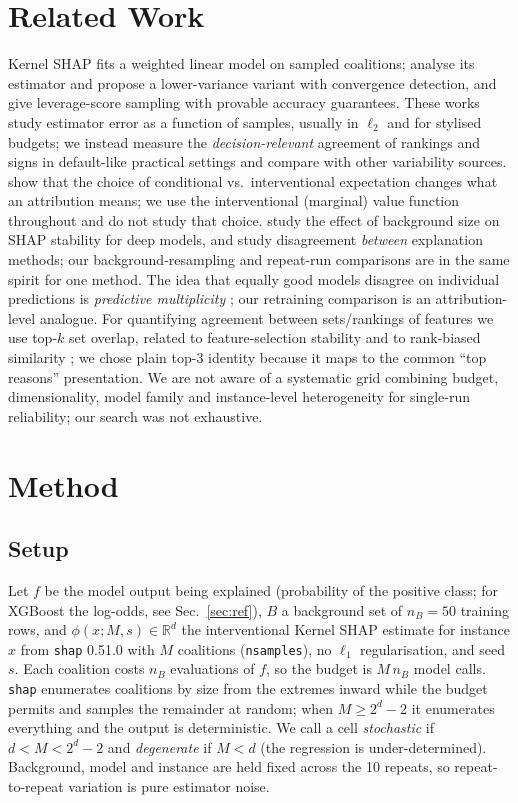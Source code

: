\documentclass{article}
\begin{document}
\section{Related Work}
Kernel SHAP \citep{lundberg2017} fits a weighted linear model on sampled coalitions; \citet{covert2021} analyse its estimator and propose a lower-variance variant with convergence detection, and \citet{musco2024} give leverage-score sampling with provable accuracy guarantees. These works study estimator error as a function of samples, usually in $\ell_2$ and for stylised budgets; we instead measure the \emph{decision-relevant} agreement of rankings and signs in default-like practical settings and compare with other variability sources. \citet{chen2020} show that the choice of conditional vs.\ interventional expectation changes what an attribution means; we use the interventional (marginal) value function throughout and do not study that choice. \citet{yuan2022} study the effect of background size on SHAP stability for deep models, and \citet{krishna2022} study disagreement \emph{between} explanation methods; our background-resampling and repeat-run comparisons are in the same spirit for one method. The idea that equally good models disagree on individual predictions is \emph{predictive multiplicity} \citep{marx2020}; our retraining comparison is an attribution-level analogue. For quantifying agreement between sets/rankings of features we use top-$k$ set overlap, related to feature-selection stability \citep{nogueira2018} and to rank-biased similarity \citep{webber2010}; we chose plain top-3 identity because it maps to the common ``top reasons'' presentation. We are not aware of a systematic grid combining budget, dimensionality, model family and instance-level heterogeneity for single-run reliability; our search was not exhaustive.

\section{Method}
\subsection{Setup}
Let $f$ be the model output being explained (probability of the positive class; for XGBoost the log-odds, see Sec.~\ref{sec:ref}), $B$ a background set of $n_B{=}50$ training rows, and $\phi(x;M,s)\in\mathbb{R}^d$ the interventional Kernel SHAP estimate for instance $x$ from \texttt{shap} 0.51.0 with $M$ coalitions (\texttt{nsamples}), no $\ell_1$ regularisation, and seed $s$. Each coalition costs $n_B$ evaluations of $f$, so the budget is $M\,n_B$ model calls. \texttt{shap} enumerates coalitions by size from the extremes inward while the budget permits and samples the remainder at random; when $M\ge 2^d-2$ it enumerates everything and the output is deterministic. We call a cell \emph{stochastic} if $d<M<2^d-2$ and \emph{degenerate} if $M<d$ (the regression is under-determined). Background, model and instance are held fixed across the 10 repeats, so repeat-to-repeat variation is pure estimator noise.
\end{document}
